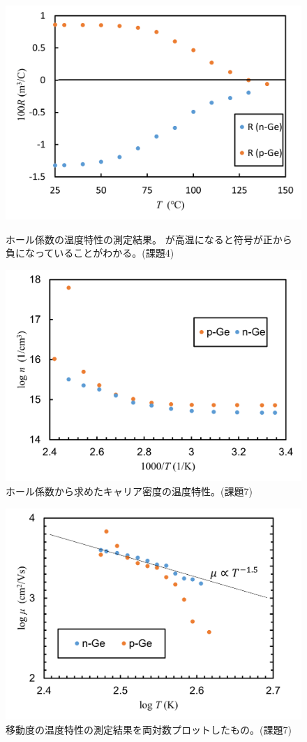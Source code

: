 \documentclass[11pt,dvipdfmx,a4paper]{jsarticle}
\numberwithin{equation}{section}
\begin{document}
\begin{figure}[H]
	\begin{minipage}[t]{0.45\columnwidth}
		\centering
		\includegraphics[width=\columnwidth]{graph/graph07.png}
		\caption{\small{ホール係数の温度特性の測定結果。
		が高温になると符号が正から負になっていることがわかる。(課題4)}}
		\label{graph:07}
	\end{minipage}
	\hfil
	\begin{minipage}[t]{0.45\columnwidth}
		\centering
		\includegraphics[width=\columnwidth]{graph/graph08.png}
		\caption{\small{ホール係数から求めたキャリア密度の温度特性。(課題7)}}
		\label{graph:08}
	\end{minipage}
\end{figure}

\begin{figure}[H]
	\centering
	\includegraphics[width=0.49\columnwidth]{graph/graph10.png}
	\caption{\small{移動度の温度特性の測定結果を両対数プロットしたもの。(課題7)}}
	\label{graph:10}
\end{figure}
\end{document}
